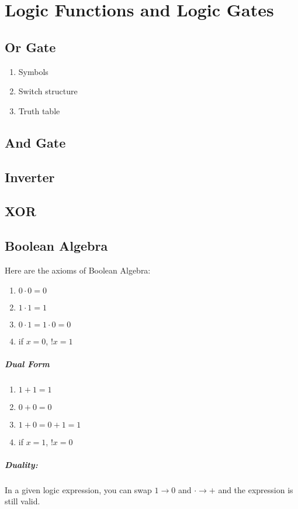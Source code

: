 \documentclass[a4paper,12pt]{report}
\begin{document}
\chapter{Logic Functions and Logic Gates}
\section{Or Gate}
\begin{enumerate}
\item Symbols
\item Switch structure
\item Truth table
\end{enumerate}

\section{And Gate}

\section{Inverter}

\section{XOR}

\section{Boolean Algebra}
Here are the axioms of Boolean Algebra:
\begin{enumerate}
\item $0 \cdot 0 = 0$
\item $1 \cdot 1 = 1$
\item $0 \cdot 1 = 1 \cdot 0 = 0$
\item if $x = 0$, $!x = 1$
\end{enumerate}

\paragraph{Dual Form}
\begin{enumerate}
\item $1 + 1 = 1$
\item $0 + 0 = 0$
\item $1 + 0 = 0 + 1 = 1$
\item if $x = 1$, $!x = 0$
\end{enumerate}

\paragraph{Duality: } In a given logic expression, you can swap $1 \to 0$ and $\cdot \to +$
and the expression is still valid.
\end{document}
